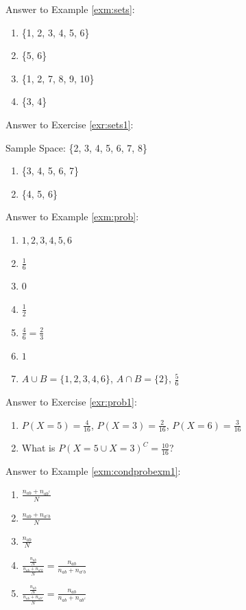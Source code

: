 \documentclass[]{book}
\providecommand{\tightlist}{%
  \setlength{\itemsep}{0pt}\setlength{\parskip}{0pt}}
\theoremstyle{definition}
\theoremstyle{definition}
\theoremstyle{definition}
\theoremstyle{remark}
\begin{document}
Answer to Example \ref{exm:sets}:

\begin{enumerate}
\def\labelenumi{\arabic{enumi}.}
\tightlist
\item
  \{1, 2, 3, 4, 5, 6\}
\item
  \{5, 6\}
\item
  \{1, 2, 7, 8, 9, 10\}
\item
  \{3, 4\}
\end{enumerate}

Answer to Exercise \ref{exr:sets1}:

Sample Space: \{2, 3, 4, 5, 6, 7, 8\}

\begin{enumerate}
\def\labelenumi{\arabic{enumi}.}
\tightlist
\item
  \{3, 4, 5, 6, 7\}
\item
  \{4, 5, 6\}
\end{enumerate}

Answer to Example \ref{exm:prob}:

\begin{enumerate}
\def\labelenumi{\arabic{enumi}.}
\item
  \({1, 2, 3, 4, 5, 6}\)
\item
  \(\frac{1}{6}\)
\item
  \(0\)
\item
  \(\frac{1}{2}\)
\item
  \(\frac{4}{6} = \frac{2}{3}\)
\item
  \(1\)
\item
  \(A\cup B=\{1, 2, 3, 4, 6\}\), \(A\cap B=\{2\}\), \(\frac{5}{6}\)
\end{enumerate}

Answer to Exercise \ref{exr:prob1}:

\begin{enumerate}
\def\labelenumi{\arabic{enumi}.}
\item
  \(P(X = 5) = \frac{4}{16}\), \(P(X = 3) = \frac{2}{16}\), \(P(X = 6) = \frac{3}{16}\)
\item
  What is \(P(X=5 \cup X = 3)^C = \frac{10}{16}\)?
\end{enumerate}

Answer to Example \ref{exm:condprobexm1}:

\begin{enumerate}
\def\labelenumi{\arabic{enumi}.}
\item
  \(\frac{n_{ab} + n_{ab^c}}{N}\)
\item
  \(\frac{n_{ab} + n_{a^cb}}{N}\)
\item
  \(\frac{n_{ab}}{N}\)
\item
  \(\frac{\frac{n_{ab}}{N}}{\frac{n_{ab} + n_{a^cb}}{N}} = \frac{n_{ab}}{n_{ab} + n_{a^cb}}\)
\item
  \(\frac{\frac{n_{ab}}{N}}{\frac{n_{ab} + n_{ab^c}}{N}} = \frac{n_{ab}}{n_{ab} + n_{ab^c}}\)
\end{enumerate}
\end{document}
